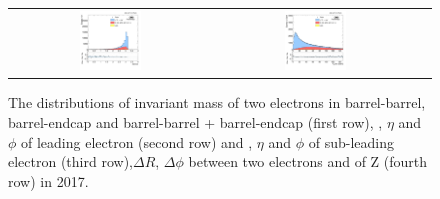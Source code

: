 \begin{figure}[ht]
\begin{center}
\begin{tabular}{ccc}
      \includegraphics[width=0.32\textwidth]{figures/Zprime/2017/complementary/h_Dphi_ll.png}&
      \includegraphics[width=0.32\textwidth]{figures/Zprime/2017/complementary/h_Ptll.png}\\
    \end{tabular}
    \caption{The distributions of invariant mass of two electrons in barrel-barrel, barrel-endcap and barrel-barrel + barrel-endcap (first row), \et, $\eta$ and $\phi$ of leading electron (second row) and \et, $\eta$ and $\phi$ of sub-leading electron (third row),$\Delta R$, $\Delta\phi$ between two electrons and \pt of Z (fourth row) in 2017.
    \label{fig:complementary_2017}}
  \end{center}
\end{figure}


\clearpage

